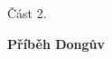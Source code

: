 
    \begin{center}
        \vspace*{1cm}
        \Huge
        Část 2.
        \vspace{8cm}

        
        {\fontsize{50}{50}\selectfont \textbf{Příběh Dongův}}
            
        \vspace{1.5cm}
        \thispagestyle{empty}
            

            
    \end{center}
